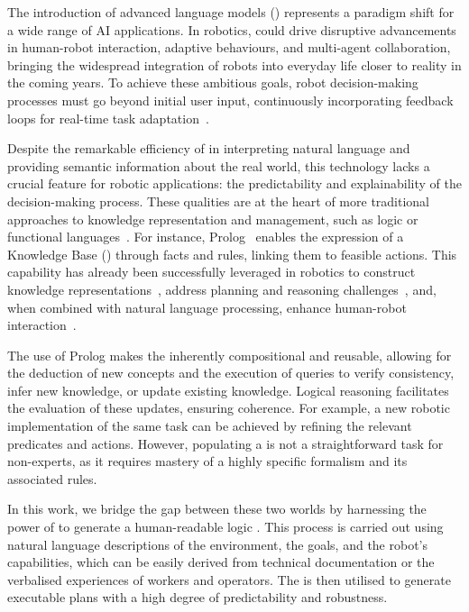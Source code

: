 The introduction of advanced language models (\llms) represents a
paradigm shift for a wide range of AI applications. In
robotics, \llms could drive disruptive advancements in human-robot
interaction, adaptive behaviours, and multi-agent collaboration,
bringing the widespread integration of robots into everyday life
closer to reality in the coming years.
To achieve these ambitious goals, robot decision-making processes must
go beyond initial user input, continuously incorporating feedback
loops for real-time task adaptation~\cite{ugur2025neuro}.

Despite the remarkable efficiency of \llms in interpreting natural
language and providing semantic information about the real world, this
technology lacks a crucial feature for robotic applications: the
predictability and explainability of the decision-making process.
These qualities are at the heart of more traditional approaches to
knowledge representation and management, such as logic or functional
languages~\cite{PAULIUS201913}. For instance,
Prolog~\cite{clocksin2003programming} enables the expression of a
Knowledge Base (\kb) through facts and rules, linking them to feasible
actions. This capability has already been successfully leveraged in
robotics to construct knowledge representations~\cite{Ten13}, address
planning and reasoning challenges~\cite{prologPlanning}, and, when
combined with natural language processing, enhance human-robot
interaction~\cite{NLPProlog1,NLPProlog2}.

The use of Prolog makes the \kb inherently compositional and reusable,
allowing for the deduction of new concepts and the execution of
queries to verify consistency, infer new knowledge, or update existing
knowledge. Logical reasoning facilitates the evaluation of these
updates, ensuring coherence. For example, a new robotic implementation
of the same task can be achieved by refining the relevant predicates
and actions.  However, populating a \kb is not a straightforward task
for non-experts, as it requires mastery of a highly specific formalism
and its associated rules.

In this work, we bridge the gap between these two worlds by
harnessing the power of \llms to generate a human-readable
logic \kb. This process is carried out using natural language
descriptions of the environment, the goals, and the robot’s
capabilities, which can be easily derived from technical documentation
or the verbalised experiences of workers and operators. The \kb\/ is
then utilised to generate executable plans with a high degree of
predictability and robustness.

